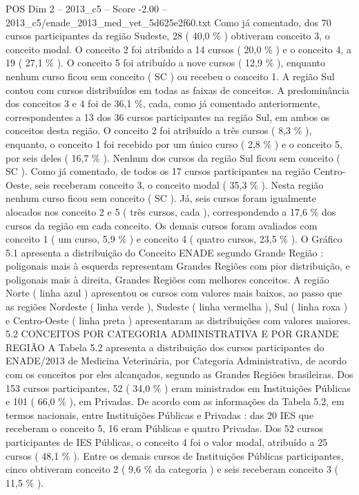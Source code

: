 \begin{textsample}{POS Dim 2 – 2013\_c5 – Score -2.00 – 2013\_c5/enade\_2013\_med\_vet\_5d625e2f60.txt}
Como já comentado, dos 70 cursos participantes da região Sudeste, 28 ( 40,0 \% ) obtiveram conceito 3, o conceito modal.
O conceito 2 foi atribuído a 14 cursos ( 20,0 \% ) e o conceito 4, a 19 ( 27,1 \% ).
O conceito 5 foi atribuído a nove cursos ( 12,9 \% ), enquanto nenhum curso ficou sem conceito ( SC ) ou recebeu o conceito 1.
A região Sul contou com cursos distribuídos em todas as faixas de conceitos.
A predominância dos conceitos 3 e 4 foi de 36,1 \%, cada, como já comentado anteriormente, correspondentes a 13 dos 36 cursos participantes na região Sul, em ambos os conceitos desta região.
O conceito 2 foi atribuído a três cursos ( 8,3 \% ), enquanto, o conceito 1 foi recebido por um único curso ( 2,8 \% ) e o conceito 5, por seis deles ( 16,7 \% ).
Nenhum dos cursos da região Sul ficou sem conceito ( SC ).
Como já comentado, de todos os 17 cursos participantes na região Centro-Oeste, seis receberam conceito 3, o conceito modal ( 35,3 \% ).
Nesta região nenhum curso ficou sem conceito ( SC ).
Já, seis cursos foram igualmente alocados nos conceito 2 e 5 ( três cursos, cada ), correspondendo a 17,6 \% dos cursos da região em cada conceito.
Os demais cursos foram avaliados com conceito 1 ( um curso, 5,9 \% ) e conceito 4 ( quatro cursos, 23,5 \% ).
O Gráfico 5.1 apresenta a distribuição do Conceito ENADE segundo Grande Região : poligonais mais à esquerda representam Grandes Regiões com pior distribuição, e poligonais mais à direita, Grandes Regiões com melhores conceitos.
A região Norte ( linha azul ) apresentou os cursos com valores mais baixos, ao passo que as regiões Nordeste ( linha verde ), Sudeste ( linha vermelha ), Sul ( linha roxa ) e Centro-Oeste ( linha preta ) apresentaram as distribuições com valores maiores. 5.2 CONCEITOS POR CATEGORIA ADMINISTRATIVA E POR GRANDE REGIÃO A Tabela 5.2 apresenta a distribuição dos cursos participantes do ENADE/2013 de Medicina Veterinária, por Categoria Administrativa, de acordo com os conceitos por eles alcançados, segundo as Grandes Regiões brasileiras.
Dos 153 cursos participantes, 52 ( 34,0 \% ) eram ministrados em Instituições Públicas e 101 ( 66,0 \% ), em Privadas.
De acordo com as informações da Tabela 5.2, em termos nacionais, entre Instituições Públicas e Privadas : das 20 IES que receberam o conceito 5, 16 eram Públicas e quatro Privadas.
Dos 52 cursos participantes de IES Públicas, o conceito 4 foi o valor modal, atribuído a 25 cursos ( 48,1 \% ).
Entre os demais cursos de Instituições Públicas participantes, cinco obtiveram conceito 2 ( 9,6 \% da categoria ) e seis receberam conceito 3 ( 11,5 \% ).

\end{textsample}
